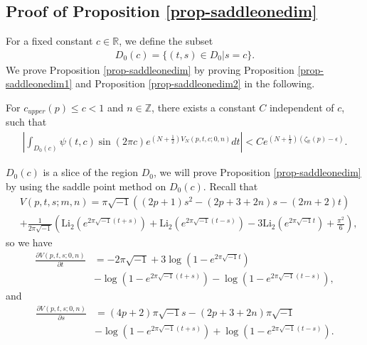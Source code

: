 \documentclass[12pt]{amsart}
\begin{document}
\subsection{Proof of Proposition \ref{prop-saddleonedim}}  \label{appendix-onesaddle}
For a fixed constant $c\in \mathbb{R}$, we define the subset 
\begin{align}
    D_0(c)=\{(t,s)\in D_0| s=c\}.
\end{align}
We prove Proposition \ref{prop-saddleonedim} by proving Proposition \ref{prop-saddleonedim1} and Proposition \ref{prop-saddleonedim2} in the following.
\begin{proposition} \label{prop-saddleonedim1}
    For $c_{upper}(p)\leq c<1$ and $n\in \mathbb{Z}$, there exists a constant $C$ independent of $c$, such that
    \begin{align}
        |\int_{D_0(c)} \psi(t,c)\sin(2\pi c)e^{(N+\frac{1}{2})V_N(p,t,c;0,n)}dt|<Ce^{(N+\frac{1}{2})\left(\zeta_{\mathbb{R}}(p)-\epsilon\right)}. 
    \end{align}
\end{proposition}
$D_{0}(c)$ is a slice of the region $D_0$, we will prove Proposition \ref{prop-saddleonedim} by using the saddle point method on $D_0(c)$.
Recall that
\begin{align}
    &V(p,t,s;m,n)=\pi \sqrt{-1}\left((2p+1)s^2-(2p+3+2n)s-(2m+2)t\right)\\\nonumber
    &+\frac{1}{2\pi\sqrt{-1}}\left(\text{Li}_2(e^{2\pi\sqrt{-1}(t+s)})+\text{Li}_2(e^{2\pi\sqrt{-1}(t-s)})-3\text{Li}_2(e^{2\pi\sqrt{-1}t})+\frac{\pi^2}{6}\right),
\end{align}
so we have
\begin{align}
    \frac{\partial V(p,t,s; 0,n)}{\partial t}&=-2\pi\sqrt{-1}+3\log(1-e^{2\pi\sqrt{-1}t})\\\nonumber
    &-\log(1-e^{2\pi\sqrt{-1}(t+s)})-\log(1-e^{2\pi\sqrt{-1}(t-s)}),
\end{align}
and
\begin{align}
    \frac{\partial V(p,t,s; 0,n)}{\partial s}&=(4p+2)\pi\sqrt{-1}s-(2p+3+2n)\pi\sqrt{-1}\\\nonumber
    &-\log(1-e^{2\pi\sqrt{-1}(t+s)})+\log(1-e^{2\pi\sqrt{-1}(t-s)}).
\end{align}
\end{document}
